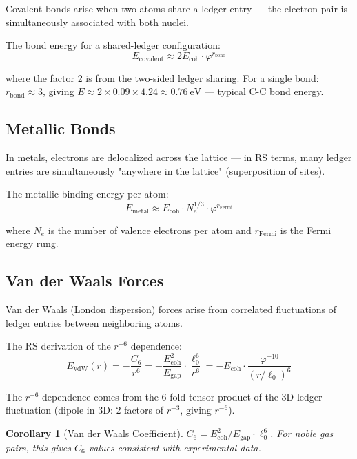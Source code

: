 \documentclass[12pt,a4paper]{article}
\newtheorem{corollary}[theorem]{Corollary}
\theoremstyle{definition}
\theoremstyle{remark}
\begin{document}
Covalent bonds arise when two atoms share a ledger entry — the electron pair is 
simultaneously associated with both nuclei.

The bond energy for a shared-ledger configuration:
\begin{equation}
E_\mathrm{covalent} \approx 2 E_\mathrm{coh} \cdot \varphi^{r_\mathrm{bond}}
\end{equation}

where the factor 2 is from the two-sided ledger sharing. For a single bond: $r_\mathrm{bond} \approx 3$, 
giving $E \approx 2 \times 0.09 \times 4.24 \approx 0.76~\mathrm{eV}$ — typical C-C bond energy.

\subsection{Metallic Bonds}

In metals, electrons are delocalized across the lattice — in RS terms, many ledger 
entries are simultaneously "anywhere in the lattice" (superposition of sites).

The metallic binding energy per atom:
\begin{equation}
E_\mathrm{metal} \approx E_\mathrm{coh} \cdot N_e^{1/3} \cdot \varphi^{r_\mathrm{Fermi}}
\end{equation}

where $N_e$ is the number of valence electrons per atom and $r_\mathrm{Fermi}$ is 
the Fermi energy rung.

\subsection{Van der Waals Forces}

Van der Waals (London dispersion) forces arise from correlated fluctuations of 
ledger entries between neighboring atoms.

The RS derivation of the $r^{-6}$ dependence:
\begin{equation}
E_\mathrm{vdW}(r) = -\frac{C_6}{r^6} = -\frac{E_\mathrm{coh}^2}{E_\mathrm{gap}} \cdot \frac{\ell_0^6}{r^6}
= -E_\mathrm{coh} \cdot \frac{\varphi^{-10}}{(r/\ell_0)^6}
\end{equation}

The $r^{-6}$ dependence comes from the 6-fold tensor product of the 3D ledger 
fluctuation (dipole in 3D: 2 factors of $r^{-3}$, giving $r^{-6}$).

\begin{corollary}[Van der Waals Coefficient]
$C_6 = E_\mathrm{coh}^2 / E_\mathrm{gap} \cdot \ell_0^6$.
For noble gas pairs, this gives $C_6$ values consistent with experimental data.
\end{corollary}
\end{document}
